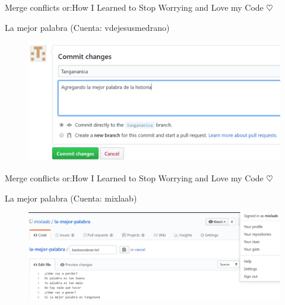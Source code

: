 \documentclass[10pt]{beamer}
\begin{document}
\begin{frame}{Merge conflicts or:}{How I Learned to Stop Worrying and Love my Code $\heartsuit$}

\begin{block}{La mejor palabra (Cuenta: vdejesusmedrano)}

\begin{figure}[h!]
\centering
\includegraphics [scale=0.3]{tangananica2}
\label{fig:issues}
\end{figure}
    
\end{block}

\end{frame}

\begin{frame}{Merge conflicts or:}{How I Learned to Stop Worrying and Love my Code $\heartsuit$}

\begin{block}{La mejor palabra (Cuenta: mixlaab)}

\begin{figure}[h!]
\centering
\includegraphics [scale=0.25]{tanganana}
\label{fig:issues}
\end{figure}
    
\end{block}

\end{frame}
\end{document}
